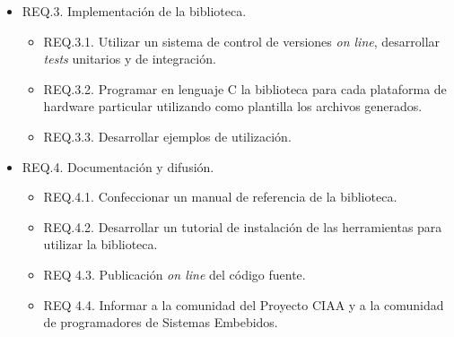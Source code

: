 \begin{itemize}
\item REQ.3. Implementación de la biblioteca.
\begin{itemize}
\item REQ.3.1. Utilizar un sistema de control de versiones \emph{on line}, desarrollar \emph{tests} unitarios y de integración.
\item REQ.3.2. Programar en lenguaje C la biblioteca para cada plataforma de hardware particular utilizando como plantilla los archivos generados.
\item REQ.3.3. Desarrollar ejemplos de utilización.
\end{itemize}
\item REQ.4. Documentación y difusión.
\begin{itemize}
\item REQ.4.1. Confeccionar un manual de referencia de la biblioteca.
\item REQ.4.2. Desarrollar un tutorial de instalación de las herramientas para utilizar la biblioteca.
\item REQ 4.3. Publicación \emph{on line} del código fuente.
\item REQ 4.4. Informar a la comunidad del Proyecto CIAA y a la comunidad de programadores de Sistemas Embebidos.
\end{itemize}
\end{itemize} %

% 
% 

